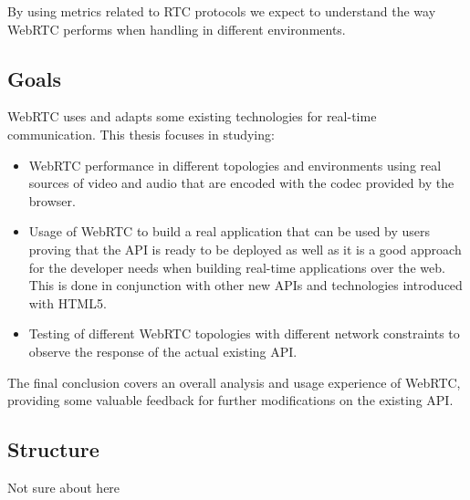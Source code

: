 By using metrics related to RTC protocols we expect to understand the way WebRTC performs when handling in different environments.

\subsection{Goals}

WebRTC uses and adapts some existing technologies for real-time communication. This thesis focuses in studying:

\begin{itemize}
	\item WebRTC performance in different topologies and environments using real sources of video and audio that are encoded with the codec provided by the browser.
	
	\item Usage of WebRTC to build a real application that can be used by users proving that the API is ready to be deployed as well as it is a good approach for the developer needs when building real-time applications over the web. This is done in conjunction with other new APIs and technologies introduced with HTML5.
	
	\item Testing of different WebRTC topologies with different network constraints to observe the response of the actual existing API.
\end{itemize}

The final conclusion covers an overall analysis and usage experience of WebRTC, providing some valuable feedback for further modifications on the existing API.

\subsection{Structure}

Not sure about here